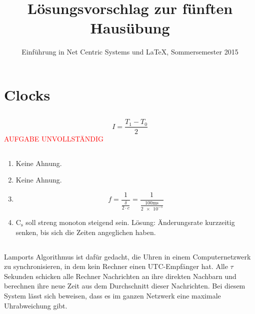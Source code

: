 \documentclass[a4paper,
			llpt,
			solution,
			accentcolor=tud2d,
			colorbacktitle
			]
			{tudexercise}
\title{Lösungsvorschlag zur fünften Hausübung}
\subtitle{Einführung in Net Centric Systems und \LaTeX, Sommersemester 2015}
\begin{document}
\maketitle
\section{}
\section{}
\section{Clocks}
\subsection{}
$$
I = \frac{T_1 - T_0}{2}
$$
\textcolor{red}{AUFGABE UNVOLLSTÄNDIG}
\subsection{}
\begin{enumerate}
\item Keine Ahnung.
\item Keine Ahnung.
\item $$f = \frac{1}{\frac{\delta}{2\cdot c}} = \frac{1}{\frac{100\text{ms}}{\num{2e-5}}}$$
\item $\text{C}_\text{s}$ soll streng monoton steigend sein. Lösung: Änderungsrate kurzzeitig senken, bis sich die Zeiten angeglichen haben.
\end{enumerate}
\subsection{}
Lamports Algorithmus ist dafür gedacht, die Uhren in einem Computernetzwerk zu synchronisieren, in dem kein Rechner einen UTC-Empfänger hat. Alle $\tau$ Sekunden schicken alle Rechner Nachrichten an ihre direkten Nachbarn und berechnen ihre neue Zeit aus dem Durchschnitt dieser Nachrichten. Bei diesem System lässt sich beweisen, dass es im ganzen Netzwerk eine maximale Uhrabweichung gibt.
\end{document}

